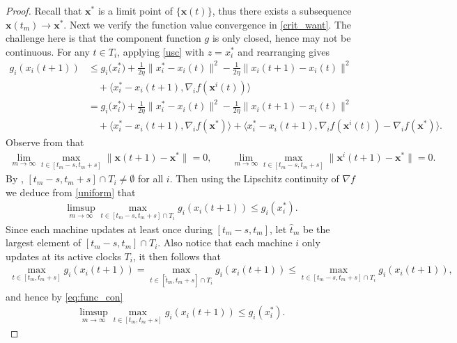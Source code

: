 \documentclass[leqno,onefignum,onetabnum]{siamart0516}
\newcommand{\xb}{\mathbf{x}}
\newcommand{\inner}[2]{\langle #1, #2 \rangle}
\begin{document}
\begin{proof}
	Recall that $\xb^*$ is a limit point of $\{\xb(t)\}$, thus there exists a  subsequence $\xb(t_m) \to \xb^*$. Next we verify the function value convergence in \cref{crit_want}. 
	The challenge here is that the component function $g$ is only closed, hence may not be continuous. 
	For any $t \in T_i$, applying \cref{usc} with $z = x_i^*$ and rearranging gives 
	\begin{align}
	g_i(x_i(t + 1)) 
	&\le 
	g_i\big(x^*_i\big) + \frac{1}{2\eta}\|x_i^* - x_i(t)\|^2  - \frac{1}{2\eta}\|x_i(t+1) - x_i(t)\|^2  \nonumber\\
	&\quad + \inner{x_i^* - x_i(t+1)}{\nabla_i f(\xb^i(t))}  \nonumber\\
	\label{uniform}
	&= 
	g_i\big(x^*_i\big) + \frac{1}{2\eta}\|x_i^* - x_i(t)\|^2  - \frac{1}{2\eta}\|x_i(t+1) - x_i(t)\|^2  
	\\
	& \quad + \inner{x_i^* - x_i(t+1)}{\nabla_i f(\xb^*)} + \inner{x_i^* - x_i(t+1)}{\nabla_i f(\xb^i(t)) - \nabla_i f(\xb^*)}.
	\nonumber
	\end{align}
	 Observe from  that 
	\begin{align*}
	\lim_{m\to\infty} \max_{t \in [t_m-s, t_m + s]} \|\xb(t+1) - \xb^*\| = 0, \qquad \lim_{m\to\infty} \max_{t \in [t_m-s, t_m + s]} \|\xb^i(t+1) - \xb^*\| = 0.
	\end{align*}
	By , $[t_m -s, t_m + s] \cap T_i \ne \emptyset$ for all $i$. Then using the Lipschitz continuity of $\nabla f$ we deduce from \cref{uniform} that
	\begin{align}
	\label{eq:func_con}
	\limsup_{m \to \infty} \max_{t\in[t_m-s, t_m+s] \cap T_i} g_i(x_i(t+1)) \leq g_i(x_i^*).
	\end{align}
	Since each machine updates at least once during $[t_m-s, t_m]$, let $\hat t_m$ be the largest element of $[t_m-s, t_m] \cap T_i$.
	Also notice that each machine $i$ only updates at its active clocks $T_i$, it then follows that
	\begin{align*}
	\max_{t\in[t_m, t_m+s]} g_i(x_i(t+1)) = \max_{t\in[\hat t_m, t_m+s] \cap T_i} g_i(x_i(t+1)) \leq \max_{t\in[t_m -s, t_m+s] \cap T_i} g_i(x_i(t+1)),
	\end{align*}
	and hence by \eqref{eq:func_con}
	\begin{align}\label{eq: usc}
	\limsup_{m \to \infty} \max_{t\in[t_m, t_m+s]} g_i(x_i(t+1)) \leq  g_i(x_i^*).
	\end{align}
	

\end{proof}
\end{document}
